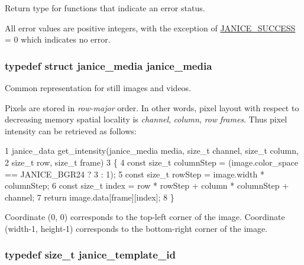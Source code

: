 Return type for functions that indicate an error status. 

All error values are positive integers, with the exception of \hyperlink{group__janice_gga4873d49c1f9d6a6880dfbd485cf6ba72a7cd6c7d28583c2dfa4e19f8642a60f3e}{J\+A\+N\+I\+C\+E\+\_\+\+S\+U\+C\+C\+E\+S\+S} = 0 which indicates no error. \hypertarget{group__janice_gabbe38be774628d27c4ab0695bd8cf155}{}
\subsubsection[{janice\+\_\+media}]{\setlength{\rightskip}{0pt plus 5cm}typedef struct {\bf janice\+\_\+media}  {\bf janice\+\_\+media}}\label{group__janice_gabbe38be774628d27c4ab0695bd8cf155}


Common representation for still images and videos. 

Pixels are stored in {\itshape row-\/major} order. In other words, pixel layout with respect to decreasing memory spatial locality is {\itshape channel}, {\itshape column}, {\itshape row} {\itshape frames}. Thus pixel intensity can be retrieved as follows\+:


\begin{DoxyCode}
1 janice\_data get\_intensity(janice\_media media, size\_t channel, size\_t column,
2                                               size\_t row, size\_t frame)
3 \{
4     const size\_t columnStep = (image.color\_space == JANICE\_BGR24 ? 3 : 1);
5     const size\_t rowStep    = image.width * columnStep;
6     const size\_t index      = row * rowStep + column * columnStep + channel;
7     return image.data[frame][index];
8 \}
\end{DoxyCode}


Coordinate (0, 0) corresponds to the top-\/left corner of the image. Coordinate (width-\/1, height-\/1) corresponds to the bottom-\/right corner of the image. \hypertarget{group__janice_ga5ec62465fbbc7a92faadfefd3d20e25b}{}
\subsubsection[{janice\+\_\+template\+\_\+id}]{\setlength{\rightskip}{0pt plus 5cm}typedef size\+\_\+t {\bf janice\+\_\+template\+\_\+id}}\label{group__janice_ga5ec62465fbbc7a92faadfefd3d20e25b}


